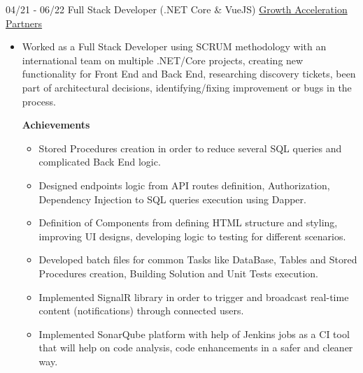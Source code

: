 \documentclass[letterpaper]{twentysecondcv} %
\begin{document}
\begin{twenty}
{\begin{itemize}
            \end{itemize}
        }

        \twentyitem
        {04/21 - 06/22}
        {Full Stack Developer (.NET Core \& VueJS)}
        { \href{https://www.growthaccelerationpartners.com/}{Growth Acceleration Partners}}
        {
            \begin{itemize}
                \item Worked as a Full Stack Developer using SCRUM methodology with an international team on multiple .NET/Core projects, creating new functionality for Front End and Back End, researching discovery tickets, been part of architectural decisions, identifying/fixing improvement or bugs in the process.
                
                \textbf{Achievements}
                \begin{itemize}

                    \item Stored Procedures creation in order to reduce several SQL queries and complicated Back End logic. %
                    
                    \item Designed endpoints logic from API routes definition, Authorization, Dependency Injection to SQL queries execution using Dapper.
                    
                    \item Definition of Components from defining HTML structure and styling, improving UI designs, developing logic to testing for different scenarios.  %
                    
                    \item Developed batch files for common Tasks like DataBase, Tables and Stored Procedures creation, Building Solution and Unit Tests execution.
                    
                    \item Implemented SignalR library in order to trigger and broadcast real-time content (notifications) through connected users.  %
                    
                    \item Implemented SonarQube platform with help of Jenkins jobs as a CI tool that will help on code analysis, code enhancements in a safer and cleaner way.  %
                    

\end{itemize}
\end{itemize}}
\end{twenty}
\end{document}
